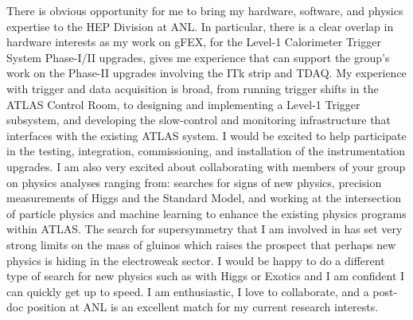 

There is obvious opportunity for me to bring my hardware, software, and physics expertise to the HEP Division at ANL. In particular, there is a clear overlap in hardware interests as my work on gFEX, for the Level-1 Calorimeter Trigger System Phase-I/II upgrades, gives me experience that can support the group's work on the Phase-II upgrades involving the ITk strip and TDAQ. My experience with trigger and data acquisition is broad, from running trigger shifts in the ATLAS Control Room, to designing and implementing a Level-1 Trigger subsystem, and developing the slow-control and monitoring infrastructure that interfaces with the existing ATLAS system. I would be excited to help participate in the testing, integration, commissioning, and installation of the instrumentation upgrades. I am also very excited about collaborating with members of your group on physics analyses ranging from: searches for signs of new physics, precision measurements of Higgs and the Standard Model, and working at the intersection of particle physics and machine learning to enhance the existing physics programs within ATLAS. The search for supersymmetry that I am involved in has set very strong limits on the mass of gluinos which raises the prospect that perhaps new physics is hiding in the electroweak sector. I would be happy to do a different type of search for new physics such as with Higgs or Exotics and I am confident I can quickly get up to speed. I am enthusiastic, I love to collaborate, and a post-doc position at ANL is an excellent match for my current research interests.


